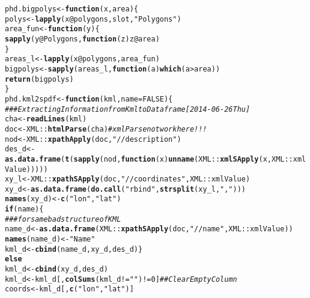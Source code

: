 \documentclass[a4paper,12pt,times,numbered,print,index]{Classes/PhDThesisPSnPDF}\usepackage[]{graphicx}\usepackage[]{color}
\makeatletter
\newcommand{\hlnum}[1]{\textcolor[rgb]{0.686,0.059,0.569}{#1}}%
\newcommand{\hlstr}[1]{\textcolor[rgb]{0.192,0.494,0.8}{#1}}%
\newcommand{\hlcom}[1]{\textcolor[rgb]{0.678,0.584,0.686}{\textit{#1}}}%
\newcommand{\hlopt}[1]{\textcolor[rgb]{0,0,0}{#1}}%
\newcommand{\hlstd}[1]{\textcolor[rgb]{0.345,0.345,0.345}{#1}}%
\newcommand{\hlkwa}[1]{\textcolor[rgb]{0.161,0.373,0.58}{\textbf{#1}}}%
\newcommand{\hlkwb}[1]{\textcolor[rgb]{0.69,0.353,0.396}{#1}}%
\newcommand{\hlkwc}[1]{\textcolor[rgb]{0.333,0.667,0.333}{#1}}%
\newcommand{\hlkwd}[1]{\textcolor[rgb]{0.737,0.353,0.396}{\textbf{#1}}}%
\newenvironment{kframe}{%
 \def\at@end@of@kframe{}%
 \ifinner\ifhmode%
  \def\at@end@of@kframe{\end{minipage}}%
  \begin{minipage}{\columnwidth}%
 \fi\fi%
 \def\FrameCommand##1{\hskip\@totalleftmargin \hskip-\fboxsep
 \colorbox{shadecolor}{##1}\hskip-\fboxsep
     \hskip-\linewidth \hskip-\@totalleftmargin \hskip\columnwidth}%
 \MakeFramed {\advance\hsize-\width
   \@totalleftmargin\z@ \linewidth\hsize
   \@setminipage}}%
 {\par\unskip\endMakeFramed%
 \at@end@of@kframe}
\newenvironment{knitrout}{}{} %
\renewenvironment{knitrout}{\begin{singlespace}}{\end{singlespace}}
\makeatother
\begin{document}
\begin{appendices}
\begin{knitrout}
\begin{kframe}
\begin{alltt}
\hlstd{phd.bigpolys}  \hlkwb{<-} \hlkwa{function}\hlstd{(}\hlkwc{x}\hlstd{,} \hlkwc{area}\hlstd{)\{}
        \hlstd{polys} \hlkwb{<-} \hlkwd{lapply}\hlstd{(x}\hlopt{@}\hlkwc{polygons} \hlstd{, slot ,} \hlstr{"Polygons"} \hlstd{)}
        \hlstd{area_fun}  \hlkwb{<-} \hlkwa{function}\hlstd{(}\hlkwc{y}\hlstd{) \{}
           \hlkwd{sapply}\hlstd{(y}\hlopt{@}\hlkwc{Polygons}\hlstd{,} \hlkwa{function}\hlstd{(}\hlkwc{z}\hlstd{) z}\hlopt{@}\hlkwc{area}\hlstd{)}
        \hlstd{\}}
        \hlstd{areas_l} \hlkwb{<-} \hlkwd{lapply}\hlstd{(x}\hlopt{@}\hlkwc{polygons}\hlstd{, area_fun)}
        \hlstd{bigpolys} \hlkwb{<-} \hlkwd{sapply}\hlstd{(areas_l,} \hlkwa{function}\hlstd{(}\hlkwc{a}\hlstd{)} \hlkwd{which}\hlstd{(a} \hlopt{>} \hlstd{area))}
        \hlkwd{return}\hlstd{(bigpolys)}
\hlstd{\}}
\hlstd{phd.kml2spdf}  \hlkwb{<-} \hlkwa{function}\hlstd{(}\hlkwc{kml}\hlstd{,} \hlkwc{name} \hlstd{=} \hlnum{FALSE}\hlstd{)\{}
  \hlcom{### Extracting Information from Kml to Dataframe [2014-06-26 Thu]}
        \hlstd{cha} \hlkwb{<-} \hlkwd{readLines}\hlstd{(kml)}
        \hlstd{doc} \hlkwb{<-} \hlstd{XML::}\hlkwd{htmlParse}\hlstd{(cha)}   \hlcom{# xmlParse not work here!!!}
        \hlstd{nod} \hlkwb{<-} \hlstd{XML::}\hlkwd{xpathApply}\hlstd{(doc,} \hlstr{"//description"}\hlstd{)}
        \hlstd{des_d}  \hlkwb{<-} \hlkwd{as.data.frame}\hlstd{(}\hlkwd{t}\hlstd{(}\hlkwd{sapply}\hlstd{(nod,} \hlkwa{function}\hlstd{(}\hlkwc{x}\hlstd{)}\hlkwd{unname}\hlstd{(XML::}\hlkwd{xmlSApply}\hlstd{(x, XML::xmlValue)))))}
        \hlstd{xy_l}  \hlkwb{<-} \hlstd{XML::}\hlkwd{xpathSApply}\hlstd{(doc,}  \hlstr{"//coordinates"}\hlstd{, XML::xmlValue)}
        \hlstd{xy_d}  \hlkwb{<-} \hlkwd{as.data.frame}\hlstd{(}\hlkwd{do.call}\hlstd{(}\hlstr{"rbind"}\hlstd{,} \hlkwd{strsplit}\hlstd{(xy_l,}\hlstr{","}\hlstd{)))}
        \hlkwd{names}\hlstd{(xy_d)}  \hlkwb{<-} \hlkwd{c}\hlstd{(}\hlstr{"lon"}\hlstd{,}\hlstr{"lat"}\hlstd{)}
        \hlkwa{if} \hlstd{(name) \{}
                \hlcom{### for same bad structure of KML}
                \hlstd{name_d}  \hlkwb{<-} \hlkwd{as.data.frame}\hlstd{(XML::}\hlkwd{xpathSApply}\hlstd{(doc,}  \hlstr{"//name"}\hlstd{, XML::xmlValue))}
                \hlkwd{names}\hlstd{(name_d)}  \hlkwb{<-} \hlstr{"Name"}
                \hlstd{kml_d}  \hlkwb{<-} \hlkwd{cbind}\hlstd{(name_d, xy_d, des_d)\}}
        \hlkwa{else}
                \hlstd{kml_d}  \hlkwb{<-} \hlkwd{cbind}\hlstd{(xy_d, des_d)}
        \hlstd{kml_d}  \hlkwb{<-} \hlstd{kml_d[,} \hlkwd{colSums}\hlstd{(kml_d} \hlopt{!=} \hlstr{""}\hlstd{)} \hlopt{!=} \hlnum{0}\hlstd{]} \hlcom{## Clear Empty Column}
        \hlstd{coords}  \hlkwb{<-} \hlstd{kml_d[,} \hlkwd{c}\hlstd{(}\hlstr{"lon"}\hlstd{,}\hlstr{"lat"}\hlstd{)]}

\end{alltt}
\end{kframe}
\end{knitrout}
\end{appendices}
\end{document}
